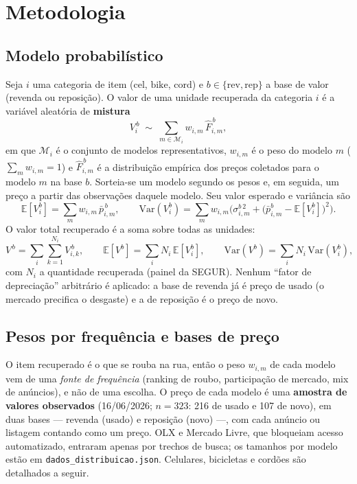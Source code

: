 \documentclass[11pt,a4paper]{article}
\begin{document}
\section{Metodologia}

\subsection{Modelo probabilístico}
Seja $i$ uma categoria de item ($\text{cel}$, $\text{bike}$, $\text{cord}$) e
$b\in\{\text{rev},\text{rep}\}$ a base de valor (revenda ou reposição). O valor de uma unidade
recuperada da categoria $i$ é a variável aleatória de \textbf{mistura}
\begin{equation}
  V_i^{\,b}\;\sim\;\sum_{m\in\mathcal{M}_i} w_{i,m}\,\hat F_{i,m}^{\,b},
  \label{eq:mix}
\end{equation}
em que $\mathcal{M}_i$ é o conjunto de modelos representativos, $w_{i,m}$ é o peso do modelo $m$
($\sum_m w_{i,m}=1$) e $\hat F_{i,m}^{\,b}$ é a distribuição empírica dos preços coletados para o
modelo $m$ na base $b$. Sorteia-se um modelo segundo os pesos e, em seguida, um preço a partir das
observações daquele modelo. Seu valor esperado e variância são
\begin{equation}
  \mathbb{E}[V_i^{b}]=\sum_m w_{i,m}\,\bar p_{i,m}^{\,b},
  \qquad
  \mathrm{Var}(V_i^{b})=\sum_m w_{i,m}\Big(\sigma_{i,m}^{b\,2}+\big(\bar p_{i,m}^{b}-\mathbb{E}[V_i^b]\big)^2\Big).
  \label{eq:moments}
\end{equation}
O valor total recuperado é a soma sobre todas as unidades:
\begin{equation}
  V^{\,b}=\sum_{i}\sum_{k=1}^{N_i} V_{i,k}^{\,b},
  \qquad
  \mathbb{E}[V^{b}]=\sum_i N_i\,\mathbb{E}[V_i^{b}],
  \qquad
  \mathrm{Var}(V^{b})=\sum_i N_i\,\mathrm{Var}(V_i^{b}),
  \label{eq:total}
\end{equation}
com $N_i$ a quantidade recuperada (painel da SEGUR). Nenhum ``fator de depreciação'' arbitrário é
aplicado: a base de revenda já é preço de usado (o mercado precifica o desgaste) e a de reposição
é o preço de novo.

\subsection{Pesos por frequência e bases de preço}
O item recuperado é o que se rouba na rua, então o peso $w_{i,m}$ de cada modelo vem de uma
\emph{fonte de frequência} (ranking de roubo, participação de mercado, mix de anúncios), e não de
uma escolha. O preço de cada modelo é uma \textbf{amostra de valores observados} (16/06/2026;
$n=323$: 216 de usado e 107 de novo), em duas bases --- revenda (usado) e reposição (novo) ---, com
cada anúncio ou listagem contando como um preço. OLX e Mercado Livre, que bloqueiam acesso
automatizado, entraram apenas por trechos de busca; os tamanhos por modelo estão em
\texttt{dados\_distribuicao.json}. Celulares, bicicletas e cordões são detalhados a seguir.
\end{document}
